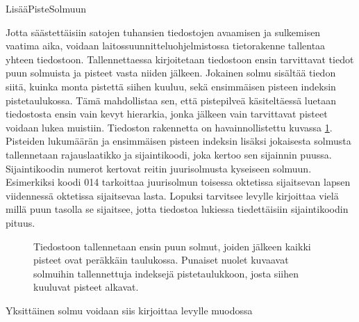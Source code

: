 \begin{algorithm}[!h]
    \caption{LisääPisteSolmuun}
    \label{alg:lisaaPiste}
    
\end{algorithm}

Jotta säästettäisiin satojen tuhansien tiedostojen avaamisen ja sulkemisen vaatima aika, voidaan laitossuunnitteluohjelmistossa tietorakenne tallentaa yhteen tiedostoon. Tallennettaessa kirjoitetaan tiedostoon ensin tarvittavat tiedot puun solmuista ja pisteet vasta niiden jälkeen. Jokainen solmu sisältää tiedon siitä, kuinka monta pistettä siihen kuuluu, sekä ensimmäisen pisteen indeksin pistetaulukossa. Tämä mahdollistaa sen, että pistepilveä käsiteltäessä luetaan tiedostosta ensin vain kevyt hierarkia, jonka jälkeen vain tarvittavat pisteet voidaan lukea muistiin. Tiedoston rakennetta on havainnollistettu kuvassa \ref{layout}. Pisteiden lukumäärän ja ensimmäisen pisteen indeksin lisäksi jokaisesta solmusta tallennetaan rajauslaatikko ja sijaintikoodi, joka kertoo sen sijainnin puussa. Sijaintikoodin  numerot kertovat reitin juurisolmusta kyseiseen solmuun. Esimerkiksi koodi 014 tarkoittaa juurisolmun toisessa oktetissa sijaitsevan lapsen viidennessä oktetissa sijaitsevaa lasta. Lopuksi tarvitsee levylle kirjoittaa vielä millä puun tasolla se sijaitsee, jotta tiedostoa lukiessa tiedettäisiin sijaintikoodin pituus.

\begin{figure}
    \centering
    
    \caption{Tiedostoon tallennetaan ensin puun solmut, joiden jälkeen kaikki pisteet ovat peräkkäin taulukossa. Punaiset nuolet kuvaavat solmuihin tallennettuja indeksejä pistetaulukkoon, josta siihen kuuluvat pisteet alkavat.}
    \label{layout}
\end{figure}

Yksittäinen solmu voidaan siis kirjoittaa levylle muodossa 


